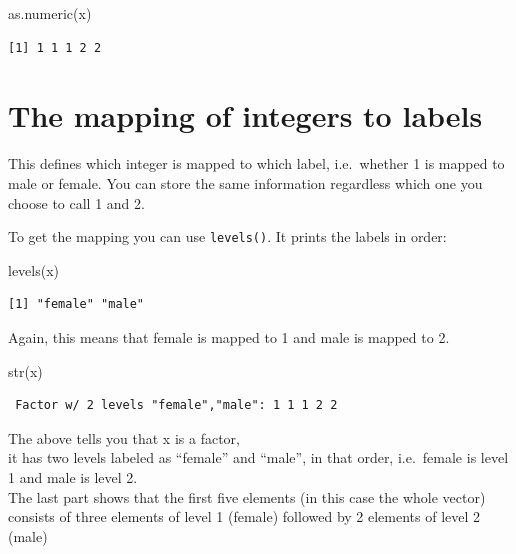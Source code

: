 \documentclass[
]{book}
\newenvironment{Shaded}{\begin{snugshade}}{\end{snugshade}}
\newcommand{\FunctionTok}[1]{\textcolor[rgb]{0.00,0.00,0.00}{#1}}
\newcommand{\NormalTok}[1]{#1}
\begin{document}
\begin{Shaded}
\begin{Highlighting}[]
\FunctionTok{as.numeric}\NormalTok{(x)}
\end{Highlighting}
\end{Shaded}

\begin{verbatim}
[1] 1 1 1 2 2
\end{verbatim}

\hypertarget{the-mapping-of-integers-to-labels}{%
\section{\texorpdfstring{The \textbf{mapping of integers to labels}}{The mapping of integers to labels}}\label{the-mapping-of-integers-to-labels}}

This defines which integer is mapped to which label, i.e.~whether 1 is mapped to male or female. You can store the same information regardless which one you choose to call 1 and 2.

To get the mapping you can use \texttt{levels()}. It prints the labels in order:

\begin{Shaded}
\begin{Highlighting}[]
\FunctionTok{levels}\NormalTok{(x)}
\end{Highlighting}
\end{Shaded}

\begin{verbatim}
[1] "female" "male"  
\end{verbatim}

Again, this means that female is mapped to 1 and male is mapped to 2.

\begin{Shaded}
\begin{Highlighting}[]
\FunctionTok{str}\NormalTok{(x)}
\end{Highlighting}
\end{Shaded}

\begin{verbatim}
 Factor w/ 2 levels "female","male": 1 1 1 2 2
\end{verbatim}

The above tells you that x is a factor,\\
it has two levels labeled as ``female'' and ``male'', in that order, i.e.~female is level 1 and male is level 2.\\
The last part shows that the first five elements (in this case the whole vector) consists of three elements of level 1 (female) followed by 2 elements of level 2 (male)
\end{document}
